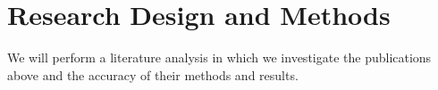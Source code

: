 \documentclass[article]{article}
\begin{document}
\section{Research Design and Methods}
We will perform a literature analysis in which we investigate the publications above and the accuracy of their methods and results.



\clearpage
 
\printbibliography
\end{document}

